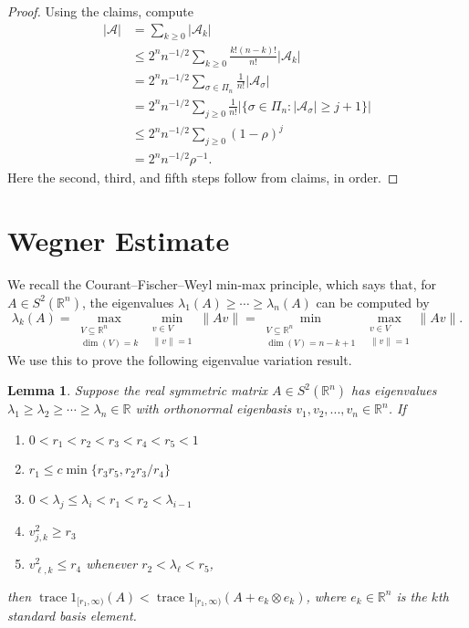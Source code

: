\documentclass{amsart}
\newtheorem{lemma}[equation]{Lemma}
\numberwithin{equation}{section}
\numberwithin{figure}{section}
\newcommand{\R}{\mathbb{R}}
\newcommand{\id}{1}
\newcommand{\trace}{\operatorname{trace}}
\begin{document}
\begin{proof}
Using the claims, compute
\begin{equation*}
\begin{aligned}
|\mathcal A|
& = \sum_{k \geq 0} |\mathcal A_k| \\
& \leq 2^n n^{-1/2} \sum_{k \geq 0} \frac{k! (n-k)!}{n!} |\mathcal A_k| \\
& = 2^n n^{-1/2} \sum_{\sigma \in \Pi_n} \frac{1}{n!} |\mathcal A_\sigma| \\
& = 2^n n^{-1/2} \sum_{j \geq 0} \frac{1}{n!} |\{ \sigma \in \Pi_n : |\mathcal A_\sigma| \geq j + 1 \}| \\
& \leq 2^n n^{-1/2} \sum_{j \geq 0} (1-\rho)^j \\
& = 2^n n^{-1/2} \rho^{-1}.
\end{aligned}
\end{equation*}
Here the second, third, and fifth steps follow from claims, in order.	
\end{proof}

\section{Wegner Estimate}

We recall the Courant--Fischer--Weyl min-max principle, which says that, for $A \in S^2(\R^n)$, the eigenvalues $\lambda_1(A) \geq \cdots \geq \lambda_n(A)$ can be computed by
\begin{equation*}
\lambda_k(A) = \max_{\substack{V \subseteq \R^n \\ \dim(V) = k}} \min_{\substack{v \in V \\ \| v \| = 1}} \| A v \| = \min_{\substack{V \subseteq \R^n \\ \dim(V) = n-k+1}} \max_{\substack{v \in V \\ \| v \| = 1}} \| A v \|.
\end{equation*}
We use this to prove the following eigenvalue variation result.

\begin{lemma}
\label{l.minmax}
Suppose the real symmetric matrix $A \in S^2(\R^n)$ has eigenvalues $\lambda_1 \geq \lambda_2 \geq \cdots \geq \lambda_n \in \R$ with orthonormal eigenbasis $v_1, v_2, ..., v_n \in \R^n$. If
\begin{enumerate}
\item $0 < r_1 < r_2 < r_3 < r_4 < r_5 < 1$
\item $r_1 \leq c \min \{ r_3 r_5, r_2 r_3 / r_4 \}$
\item $0 < \lambda_j \leq \lambda_i < r_1 < r_2 < \lambda_{i-1}$
\item $v_{j,k}^2 \geq r_3$
\item $v_{\ell,k}^2 \leq r_4$ whenever $r_2 < \lambda_\ell < r_5$,
\end{enumerate}
then $\trace \id_{[r_1,\infty)}(A) < \trace \id_{[r_1,\infty)}(A + e_k \otimes e_k)$, where $e_k \in \R^n$ is the $k$th standard basis element.
\end{lemma}
\end{document}
